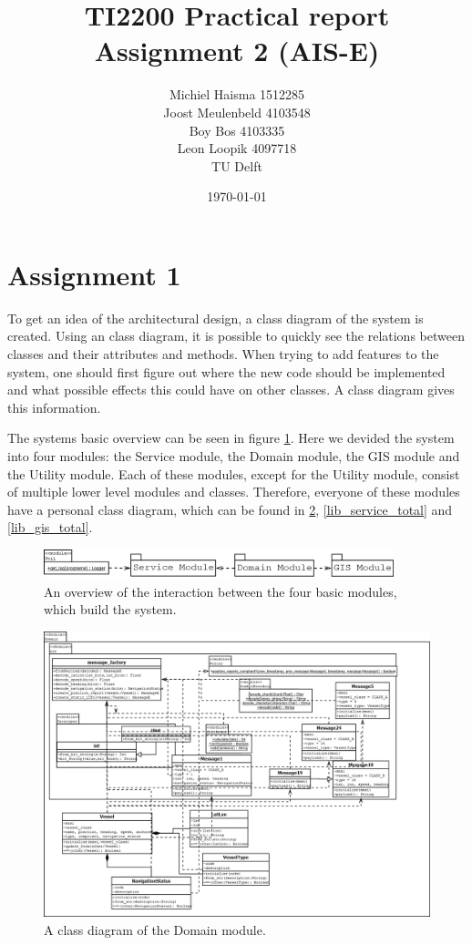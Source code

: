 \documentclass[12pt]{article}
\title{TI2200 Practical report\\
Assignment 2 (AIS-E)}
\author{Michiel Haisma 1512285\\
Joost Meulenbeld 4103548\\
Boy Bos 4103335\\
Leon Loopik 4097718\\
TU Delft\\}
\date{\today}
\begin{document}
\maketitle

\section*{Assignment 1}
To get an idea of the architectural design, a class diagram of the system is created. Using an class diagram, it is possible to quickly see the relations between classes and their attributes and methods. When trying to add features to the system, one should first figure out where the new code should be implemented and what possible effects this could have on other classes. A class diagram gives this information.

The systems basic overview can be seen in figure \ref{lib_total_overview}. Here we devided the system into four modules: the Service module, the Domain module, the GIS module and the Utility module. Each of these modules, except for the Utility module, consist of multiple lower level modules and classes. Therefore, everyone of these modules have a personal class diagram, which can be found in \ref{lib_domain_total}, \ref{lib_service_total} and \ref{lib_gis_total}.

\begin{figure}
  \centering
  \includegraphics[width=4in]{lib_total_overview}
  \caption{An overview of the interaction between the four basic modules, which build the system.}
  \label{lib_total_overview}
\end{figure}

\begin{figure}
  \centering

  \includegraphics[angle=90,width=5.5in]{lib_domain_total}
  \caption{A class diagram of the Domain module.}
  \label{lib_domain_total}
\end{figure}
\end{document}
